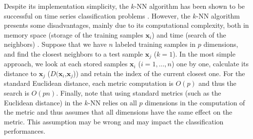 Despite its implementation simplicity, the $k$-NN algorithm has been shown to be successful on time series classification problems \cite{Belongie2002,Xi2006a,Ding2008}. 
However, the $k$-NN algorithm presents some disadvantages, mainly due to its computational complexity, both in memory space (storage of the training samples $\textbf{x}_i$) and time (search of the neighbors) \cite{Duda1973}. Suppose that we have $n$ labeled training samples in $p$ dimensions, and find the closest neighbors to a test sample $\textbf{x}_j$ ($k = 1$). In the most simple approach, we look at each stored samples $\textbf{x}_i$ ($i=1,\ldots,n$) one by one, calculate its distance to $\textbf{x}_j$ ($D(\textbf{x}_i$,$\textbf{x}_j$)) and retain the index of the current closest one. For the standard Euclidean distance, each metric computation is $O(p)$ and thus the search is $O(pn)$. Finally, note that using standard metrics (such as the Euclidean distance) in the $k$-NN relies on all $p$ dimensions in the computation of the metric and thus assumes that all dimensions have the same effect on the metric. This assumption may be wrong and may impact the classification performances. 


